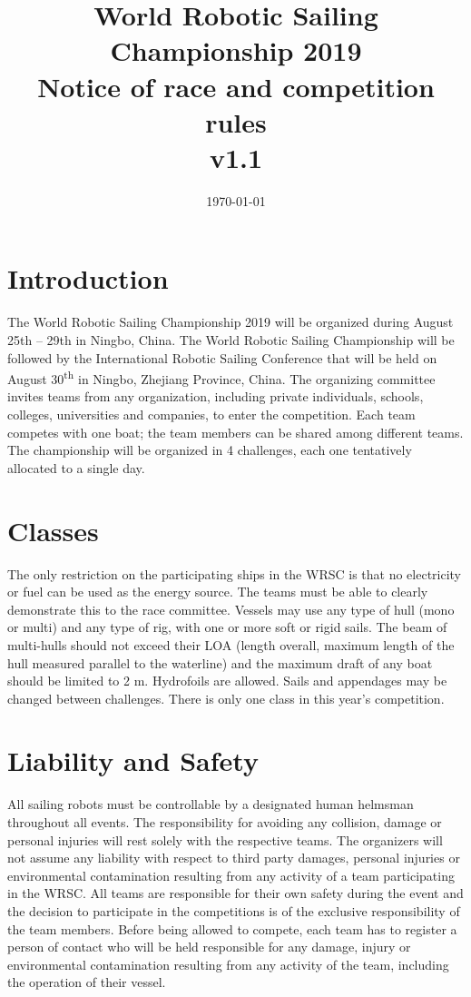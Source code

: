 \documentclass[12pt]{article}
\title{World Robotic Sailing Championship 2019 \\
Notice of race and competition rules \\v1.1}
\date{\today}
\begin{document}
\maketitle

\section{Introduction}

The World Robotic Sailing Championship 2019 will be organized during August 25th – 29th in Ningbo, China.
The World Robotic Sailing Championship will be followed by the International Robotic Sailing Conference that will be held on August 30\textsuperscript{th} in Ningbo, Zhejiang Province, China.
The organizing committee invites teams from any organization, including private individuals, schools, colleges, universities and companies, to enter the competition.
Each team competes with one boat; the team members can be shared among different teams.
The championship will be organized in 4 challenges, each one tentatively allocated to a single day. 


\section{Classes}

The only restriction on the participating ships in the WRSC is that no electricity or fuel can be used as the energy source.
The teams must be able to clearly demonstrate this to the race committee.
Vessels may use any type of hull (mono or multi) and any type of rig, with one or more soft or rigid sails.
The beam of multi-hulls should not exceed their LOA (length overall, maximum length of the hull measured parallel to the waterline) and the maximum draft of any boat should be limited to 2 m.
Hydrofoils are allowed. 
Sails and appendages may be changed between challenges. 
There is only one class in this year's competition. 

\section{Liability and Safety}
All sailing robots must be controllable by a designated human helmsman
throughout all events. The responsibility for avoiding any collision, 
damage or personal injuries will rest solely with the respective teams. 
The organizers will not assume any liability with respect to third party
damages, personal injuries or environmental contamination resulting from any
activity of a team participating in the WRSC. All teams are responsible for 
their own safety during the event and the decision to participate in the 
competitions is of the exclusive responsibility of the team members.
Before being allowed to compete, each team has to register a person of contact
who will be held responsible for any damage, injury or environmental
contamination resulting from any activity of the team, including the 
operation of their vessel.
\end{document}
